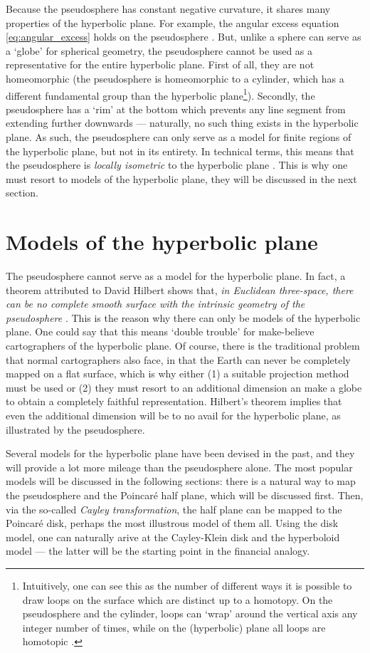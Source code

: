 Because the pseudosphere has constant negative curvature, it shares many properties of the hyperbolic plane. For example, the angular excess equation \cref{eq:angular_excess} holds on the pseudosphere \cite{Needham1997}. But, unlike a sphere can serve as a `globe' for spherical geometry, the pseudosphere cannot be used as a representative for the entire hyperbolic plane. First of all, they are not homeomorphic (the pseudosphere is homeomorphic to a cylinder, which has a different fundamental group than the hyperbolic plane\footnote{Intuitively, one can see this as the number of different ways it is possible to draw loops on the surface which are distinct up to a homotopy. On the pseudosphere and the cylinder, loops can `wrap' around the vertical axis any integer number of times, while on the (hyperbolic) plane all loops are homotopic \cite{Lee2000}.}). Secondly, the pseudosphere has a `rim' at the bottom which prevents any line segment from extending further downwards --- naturally, no such thing exists in the hyperbolic plane. As such, the pseudosphere can only serve as a model for finite regions of the hyperbolic plane, but not in its entirety. In technical terms, this means that the pseudosphere is \emph{locally isometric} to the hyperbolic plane \cite{Ghys2010}. This is why one must resort to models of the hyperbolic plane, they will be discussed in the next section.

\section{Models of the hyperbolic plane}
The pseudosphere cannot serve as a model for the hyperbolic plane. In fact, a theorem attributed to David Hilbert shows that, \emph{in Euclidean three-space, there can be no complete smooth surface with the intrinsic geometry of the pseudosphere} \cite{Thurston1997}. This is the reason why there can only be models of the hyperbolic plane. One could say that this means `double trouble' for make-believe cartographers of the hyperbolic plane. Of course, there is the traditional problem that normal cartographers also face, in that the Earth can never be completely mapped on a flat surface, which is why either (1) a suitable projection method must be used or (2) they must resort to an additional dimension an make a globe to obtain a completely faithful representation. Hilbert's theorem implies that even the additional dimension will be to no avail for the hyperbolic plane, as illustrated by the pseudosphere.

Several models for the hyperbolic plane have been devised in the past, and they will provide a lot more mileage than the pseudosphere alone. The most popular models will be discussed in the following sections: there is a natural way to map the pseudosphere and the Poincaré half plane, which will be discussed first. Then, via the so-called \emph{Cayley transformation}, the half plane can be mapped to the Poincaré disk, perhaps the most illustrous model of them all. Using the disk model, one can naturally arive at the Cayley-Klein disk and the hyperboloid model --- the latter will be the starting point in the financial analogy.

